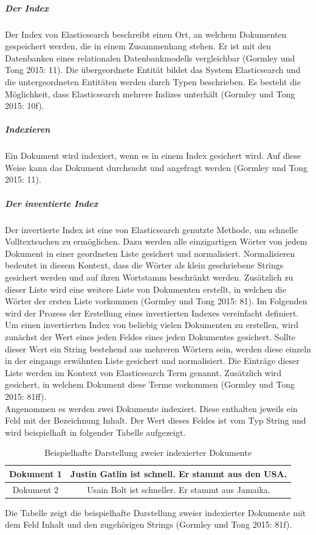 \documentclass[a4paper]{scrartcl}
\begin{document}
\subparagraph{Der Index}
Der Index von Elasticsearch beschreibt einen Ort, an welchem Dokumenten gespeichert werden, die in einem Zusammenhang stehen. Er ist mit den Datenbanken eines relationalen Datenbankmodells vergleichbar (Gormley und Tong 2015: 11). Die übergeordnete Entität bildet das System Elasticsearch und die untergeordneten Entitäten werden durch Typen beschrieben. Es besteht die Möglichkeit, dass Elasticsearch mehrere Indizes unterhält (Gormley und Tong 2015: 10f).

\subparagraph{Indexieren}
Ein Dokument wird indexiert, wenn es in einem Index gesichert wird. Auf diese Weise kann das Dokument durchsucht und angefragt werden (Gormley und Tong 2015: 11).

\subparagraph{Der inventierte Index}
Der invertierte Index ist eine von Elasticsearch genutzte Methode, um schnelle Volltextsuchen zu ermöglichen. Dazu werden alle einzigartigen Wörter von jedem Dokument in einer geordneten Liste gesichert und normalisiert. Normalisieren bedeutet in diesem Kontext, dass die Wörter als klein geschriebene Strings gesichert werden und auf ihren Wortstamm beschränkt werden. Zusätzlich zu dieser Liste wird eine weitere Liste von Dokumenten erstellt, in welchen die Wörter der ersten Liste vorkommen (Gormley und Tong 2015: 81). Im Folgenden wird der Prozess der Erstellung eines invertierten Indexes vereinfacht definiert. \\
Um einen invertierten Index von beliebig vielen Dokumenten zu erstellen, wird zunächst der Wert eines jeden Feldes eines jeden Dokumentes gesichert. Sollte dieser Wert ein String bestehend aus mehreren Wörtern sein, werden diese einzeln in der eingangs erwähnten Liste gesichert und normalisiert. Die Einträge dieser Liste werden im Kontext von Elasticsearch Term genannt. Zusätzlich wird gesichert, in welchem Dokument diese Terme vorkommen (Gormley und Tong 2015: 81ff). \\
Angenommen es werden zwei Dokumente indexiert. Diese enthalten jeweils ein Feld mit der Bezeichnung Inhalt. Der Wert dieses Feldes ist vom Typ String und wird beispielhaft in folgender Tabelle aufgezeigt. 

\begin{table}[htb]
	\centering
	\caption{Beispielhafte Darstellung zweier indexierter Dokumente}
	\begin{center}
		
		\begin{tabular}{| c | c |}
			\hline
			Dokument 1 & Justin Gatlin ist schnell. Er stammt aus den USA. \\ [0.5ex]
			\hline \hline
			Dokument 2 & Usain Bolt ist schneller. Er stammt aus Jamaika. \\
			\hline
		\end{tabular}
	\end{center}
	Die Tabelle zeigt die beispielhafte Darstellung zweier indexierter Dokumente mit dem Feld Inhalt und den zugehörigen Strings (Gormley und Tong 2015: 81f).
\end{table}
\end{document}
